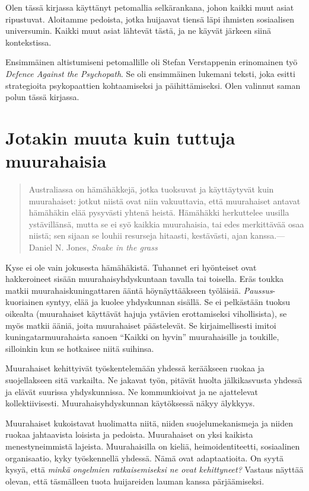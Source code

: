 Olen tässä kirjassa käyttänyt petomallia selkärankana, johon kaikki muut asiat ripustuvat. Aloitamme pedoista, jotka huijaavat tiensä läpi ihmisten sosiaalisen universumin. Kaikki muut asiat lähtevät tästä, ja ne käyvät järkeen siinä kontekstissa.

Ensimmäinen altistumiseni petomallille oli Stefan Verstappenin erinomainen työ \emph{Defence Against the Psychopath}. Se oli ensimmäinen lukemani teksti, joka esitti strategioita psykopaattien kohtaamiseksi ja päihittämiseksi. Olen valinnut saman polun tässä kirjassa.

\section{Jotakin muuta kuin tuttuja muurahaisia}

\begin{quotation}
\noindent Australiassa on hämähäkkejä, jotka tuoksuvat ja käyttäytyvät kuin muurahaiset: jotkut niistä ovat niin vakuuttavia, että muurahaiset antavat hämähäkin elää pysyvästi yhtenä heistä. Hämähäkki herkuttelee uusilla ystävillänsä, mutta se ei syö kaikkia muurahaisia, tai edes merkittävää osaa niistä; sen sijaan se louhii resurseja hitaasti, kestävästi, ajan kanssa.\newline---Daniel N. Jones, \emph{Snake in the grass}
\end{quotation}
Kyse ei ole vain jokusesta hämähäkistä. Tuhannet eri hyönteiset ovat hakkeroineet sisään muurahaisyhdyskuntaan tavalla tai toisella. Eräs toukka matkii muurahaiskuningattaren ääntä höynäyttääkseen työläisiä. \emph{Paussus}-kuoriainen syntyy, elää ja kuolee yhdyskunnan sisällä. Se ei pelkästään tuoksu oikealta (muurahaiset käyttävät hajuja ystävien erottamiseksi vihollisista), se myös matkii ääniä, joita muurahaiset päästelevät. Se kirjaimellisesti imitoi kuningatarmuurahaista sanoen ``Kaikki on hyvin'' muurahaisille ja toukille, silloinkin kun se hotkaisee niitä suihinsa.

Muurahaiset kehittyivät työskentelemään yhdessä kerääkseen ruokaa ja suojellakseen sitä varkailta. Ne jakavat työn, pitävät huolta jälkikasvusta yhdessä ja elävät suurissa yhdyskunnissa. Ne kommunkioivat ja ne ajattelevat kollektiivisesti. Muurahaisyhdyskunnan käytöksessä näkyy älykkyys.

Muurahaiset kukoistavat huolimatta niitä, niiden suojelumekanismeja ja niiden ruokaa jahtaavista loisista ja pedoista. Muurahaiset on yksi kaikista menestyneimmistä lajeista. Muurahaisilla on kieliä, heimoidentiteetti, sosiaalinen organisaatio, kyky työskennellä yhdessä. Nämä ovat adaptaatioita. On syytä kysyä, että \emph{minkä ongelmien ratkaisemiseksi ne ovat kehittyneet?} Vastaus näyttää olevan, että täsmälleen tuota huijareiden lauman kanssa pärjäämiseksi.

